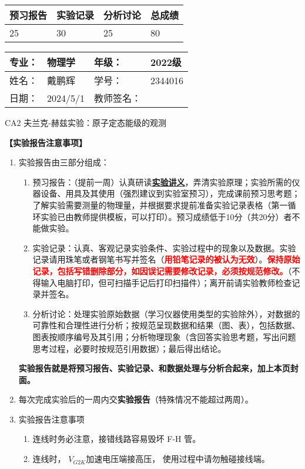 \documentclass[dvipsnames, svgnames,a4paper,11pt]{article}
\begin{document}
\begin{table}
	\renewcommand\arraystretch{1.7}
	\begin{tabularx}{\textwidth}{
		|X|X|X|X
		|X|X|X|X|}
	\hline
	\multicolumn{2}{|c|}{预习报告}&\multicolumn{2}{|c|}{实验记录}&\multicolumn{2}{|c|}{分析讨论}&\multicolumn{2}{|c|}{总成绩}\\
	\hline
	\LARGE25 & & \LARGE30 & & \LARGE25 & & \LARGE80 & \\
	\hline
	\end{tabularx}
\end{table}


\begin{table}
	\renewcommand\arraystretch{1.7}
	\begin{tabularx}{\textwidth}{|X|X|X|X|}
	\hline
	专业：& 物理学 &年级：& 2022级\\
	\hline
	姓名：& 戴鹏辉  & 学号： & 2344016 \\
	\hline
	日期：& 2024/5/1 & 教师签名：& \\
	\hline
	\end{tabularx}
\end{table}

\begin{center}
	\LARGE CA2 \quad 夫兰克-赫兹实验：原子定态能级的观测
\end{center}

\textbf{【实验报告注意事项】}
\begin{enumerate}
	\item 实验报告由三部分组成：
	\begin{enumerate}
		\item 预习报告：（提前一周）认真研读\underline{\textbf{实验讲义}}，弄清实验原理；实验所需的仪器设备、用具及其使用（强烈建议到实验室预习），完成课前预习思考题；了解实验需要测量的物理量，并根据要求提前准备实验记录表格（第一循环实验已由教师提供模板，可以打印）。预习成绩低于10分（共20分）者不能做实验。
	    \item 实验记录：认真、客观记录实验条件、实验过程中的现象以及数据。实验记录请用珠笔或者钢笔书写并签名（\textcolor{red}{\textbf{用铅笔记录的被认为无效}}）。\textcolor{red}{\textbf{保持原始记录，包括写错删除部分，如因误记需要修改记录，必须按规范修改。}}（不得输入电脑打印，但可扫描手记后打印扫描件）；离开前请实验教师检查记录并签名。
	    \item 分析讨论：处理实验原始数据（学习仪器使用类型的实验除外），对数据的可靠性和合理性进行分析；按规范呈现数据和结果（图、表），包括数据、图表按顺序编号及其引用；分析物理现象（含回答实验思考题，写出问题思考过程，必要时按规范引用数据）；最后得出结论。
	\end{enumerate}
	\textbf{实验报告就是将预习报告、实验记录、和数据处理与分析合起来，加上本页封面。}
	\item 每次完成实验后的一周内交\textbf{实验报告}（特殊情况不能超过两周）。
	\item 实验报告注意事项
		\begin{enumerate}[label=\roman*.]
			\item 连线时务必注意，接错线路容易毁坏 F-H 管。
			\item 连线时， $V_{G2K}$加速电压端接高压， 使用过程中请勿触碰接线端。
		\end{enumerate}
\end{enumerate}
\end{document}
